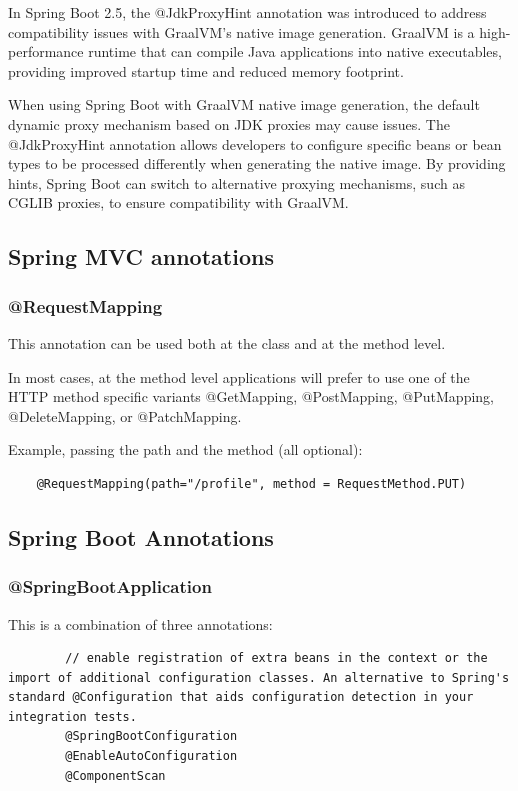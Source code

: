 \documentclass{scrartcl}
\begin{document}
In Spring Boot 2.5, the @JdkProxyHint annotation was introduced to address compatibility issues with GraalVM's native image generation. GraalVM is a high-performance runtime that can compile Java applications into native executables, providing improved startup time and reduced memory footprint.

When using Spring Boot with GraalVM native image generation, the default dynamic proxy mechanism based on JDK proxies may cause issues. The @JdkProxyHint annotation allows developers to configure specific beans or bean types to be processed differently when generating the native image. By providing hints, Spring Boot can switch to alternative proxying mechanisms, such as CGLIB proxies, to ensure compatibility with GraalVM.

\subsection{Spring MVC annotations}

\subsubsection{@RequestMapping}

This annotation can be used both at the class and at the method level.

In most cases, at the method level applications will prefer to use one of the HTTP method specific variants @GetMapping, @PostMapping, @PutMapping, @DeleteMapping, or @PatchMapping.

Example, passing the path and the method (all optional):

\begin{lstlisting}
    @RequestMapping(path="/profile", method = RequestMethod.PUT)
\end{lstlisting}

\subsection{Spring Boot Annotations}
\subsubsection{@SpringBootApplication}

    This is a combination of three annotations:

    \begin{lstlisting}
        // enable registration of extra beans in the context or the import of additional configuration classes. An alternative to Spring's standard @Configuration that aids configuration detection in your integration tests.
        @SpringBootConfiguration
        @EnableAutoConfiguration
        @ComponentScan
    \end{lstlisting}
\end{document}
